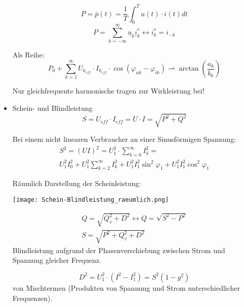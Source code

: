 \begin{itemize}
\[		      P = \bar{p}(t) = \frac{1}{T} \int_0^T u(t)\cdot i(t) dt
	      \]
	      \[
		      P = \sum_{k=-\infty}^{\infty}\underline{u}_k \underline{i}_k^* \leftrightarrow i_k^* = i_{-k}
	      \]
	      \begin{mdframed}[style=exercise]
		      Als Reihe:
		      \[
			      P_0 + \sum_{k=1}^{\infty} U_{k_{\mathit{eff}}}\cdot
                  I_{k_{\mathit{eff}}}\cdot\cos(\varphi_{uk}-\varphi_{ik}) \rightharpoonup \arctan\left( \frac{a_k}{b_k} \right)
		      \]
	      \end{mdframed}
	      Nur gleichfrequente harmonische tragen zur Wirkleistung bei!
	\item Schein- und Blindleistung\\
	      \vspace{-0.5em}
	      \[
		      \boxed{S = U_{\mathit{eff}}\cdot I_{\mathit{eff}} = U\cdot I = \sqrt{P^2+Q^2}}
	      \]
	      \vspace{-0.5em}
	      \begin{mdframed}[style=exercise]
		      Bei einem nicht linearen Verbraucher an einer Sinusförmigen Spannung:
		      \vspace{-1em}
		      \begin{multline*}
			      S^{2}=(U I)^{2}=U_{1}^{2} \cdot \sum_{k=0}^{\infty} I_{k}^{2}=\\U_{1}^{2} I_{0}^{2}+U_{1}^{2} \sum_{k=2}^{\infty} I_{k}^{2}+U_{1}^{2} I_{1}^{2} \sin ^{2} \varphi_{1}+U_{1}^{2} I_{1}^{2} \cos ^{2} \varphi_{1}
		      \end{multline*}
	      \end{mdframed}

	      Räumlich Darstellung der Scheinleistung:
	      \begin{center}
		      \vspace{-0.5em}
		      \texttt{[image: Schein-Blindleistung\_raeumlich.png]}
		      \vspace{-0.6em}
	      \end{center}

	      \begin{mdframed}[style=exercise,frametitle=Verschiebungs- Feldblindleistung $Q_v$]
		      \vspace{-1em}
		      \begin{gather*}
			      Q = \sqrt{Q^2_v + D^2} \leftrightarrow Q = \sqrt{S^2-P^2}\\
			      S = \sqrt{P^2+Q^2_v + D^2}
		      \end{gather*}
		      Blindleistung aufgrund der Phasenverschiebung zwischen Strom und
		      Spannung gleicher Frequenz.
	      \end{mdframed}
            \clearpage
	      \begin{mdframed}[style=exercise,frametitle=Verzerrunsgblindleistung $D$]
		      \[
			      D^2 = U_1^2\cdot(I^2-I_1^2) = S^2(1-g^2)
		      \]
		      von Mischtermen (Produkten von Spannung und Strom unterschiedlicher
		      Frequenzen).
	      \end{mdframed}
\end{itemize}

